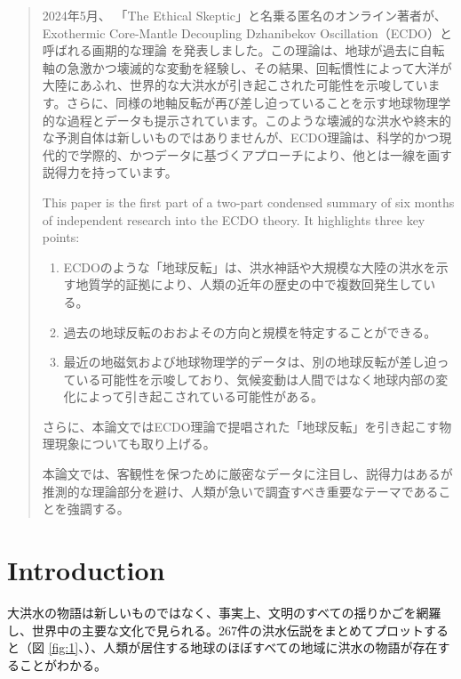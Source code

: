 \documentclass[10pt,twocolumn,letterpaper]{article}
\begin{document}
\begin{abstract}
2024年5月、 「The Ethical Skeptic」と名乗る匿名のオンライン著者が、Exothermic Core-Mantle Decoupling Dzhanibekov Oscillation（ECDO）と呼ばれる画期的な理論 \cite{0}\cite{1} を発表しました。この理論は、地球が過去に自転軸の急激かつ壊滅的な変動を経験し、その結果、回転慣性によって大洋が大陸にあふれ、世界的な大洪水が引き起こされた可能性を示唆しています。さらに、同様の地軸反転が再び差し迫っていることを示す地球物理学的な過程とデータも提示されています。このような壊滅的な洪水や終末的な予測自体は新しいものではありませんが、ECDO理論は、科学的かつ現代的で学際的、かつデータに基づくアプローチにより、他とは一線を画す説得力を持っています。

This paper is the first part of a two-part condensed summary of six months of independent research \cite{2,20} into the ECDO theory. It highlights three key points:

\begin{flushleft}
\begin{enumerate}
    \item ECDOのような「地球反転」は、洪水神話や大規模な大陸の洪水を示す地質学的証拠により、人類の近年の歴史の中で複数回発生している。
    \item 過去の地球反転のおおよその方向と規模を特定することができる。
    \item 最近の地磁気および地球物理学的データは、別の地球反転が差し迫っている可能性を示唆しており、気候変動は人間ではなく地球内部の変化によって引き起こされている可能性がある。
\end{enumerate}
\end{flushleft}

さらに、本論文ではECDO理論で提唱された「地球反転」を引き起こす物理現象についても取り上げる。

本論文では、客観性を保つために厳密なデータに注目し、説得力はあるが推測的な理論部分を避け、人類が急いで調査すべき重要なテーマであることを強調する。
\end{abstract}

\section{Introduction}

大洪水の物語は新しいものではなく、事実上、文明のすべての揺りかごを網羅し、世界中の主要な文化で見られる。267件の洪水伝説をまとめてプロットすると（図 \ref{fig:1}、\cite{3}）、人類が居住する地球のほぼすべての地域に洪水の物語が存在することがわかる。
\end{document}
